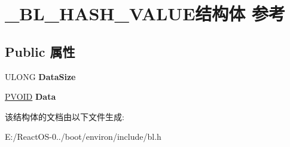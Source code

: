 \hypertarget{struct___b_l___h_a_s_h___v_a_l_u_e}{}\section{\+\_\+\+B\+L\+\_\+\+H\+A\+S\+H\+\_\+\+V\+A\+L\+U\+E结构体 参考}
\label{struct___b_l___h_a_s_h___v_a_l_u_e}
\subsection*{Public 属性}
\begin{DoxyCompactItemize}
\item 
\mbox{\label{struct___b_l___h_a_s_h___v_a_l_u_e_a81238031fdb6711b4815a5c0ea83b99a}} 
U\+L\+O\+NG {\bfseries Data\+Size}
\item 
\mbox{\label{struct___b_l___h_a_s_h___v_a_l_u_e_a27a2e937ac346a55a5a72807f294a43b}} 
\hyperlink{interfacevoid}{P\+V\+O\+ID} {\bfseries Data}
\end{DoxyCompactItemize}


该结构体的文档由以下文件生成\+:\begin{DoxyCompactItemize}
\item 
E\+:/\+React\+O\+S-\/0../boot/environ/include/bl.\+h\end{DoxyCompactItemize}
